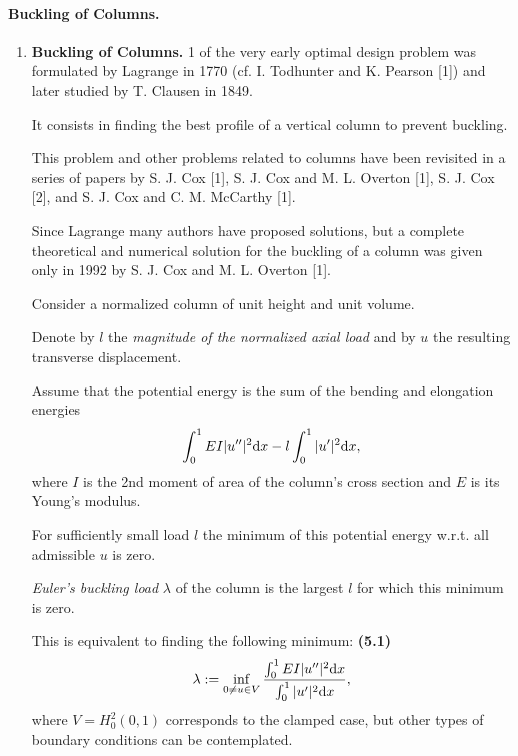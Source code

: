 \documentclass{book}
\numberwithin{equation}{section}
\begin{document}
\paragraph{Buckling of Columns.}
\begin{enumerate}
    \item \textbf{Buckling of Columns.} 1 of the very early optimal design problem was formulated by Lagrange in 1770 (cf. I. Todhunter and K. Pearson [1]) and later studied by T. Clausen in 1849.
    
    It consists in finding the best profile of a vertical column to prevent buckling.
    
    This problem and other problems related to columns have been revisited in a series of papers by S. J. Cox [1], S. J. Cox and M. L. Overton [1], S. J. Cox [2], and S. J. Cox and C. M. McCarthy [1].
    
    Since Lagrange many authors have proposed solutions, but a complete theoretical and numerical solution for the buckling of a column was given only in 1992 by S. J. Cox and M. L. Overton [1].
    
    Consider a normalized column of unit height and unit volume.
    
    Denote by $l$ the \textit{magnitude of the normalized axial load} and by $u$ the resulting transverse displacement.
    
    Assume that the potential energy is the sum of the bending and elongation energies
    \begin{align*}
        \int_0^1 EI|u''|^2{\rm d}x - l\int_0^1 |u'|^2{\rm d}x,
    \end{align*}
    where $I$ is the 2nd moment of area of the column's cross section and $E$ is its Young's modulus.
    
    For sufficiently small load $l$ the minimum of this potential energy w.r.t. all admissible $u$ is zero.
    
    \textit{Euler's buckling load} $\lambda$ of the column is the largest $l$ for which this minimum is zero.
    
    This is equivalent to finding the following minimum: \textbf{(5.1)}
    \begin{align*}
        \lambda := \inf_{0\ne u\in V} \frac{\int_0^1 EI|u''|^2{\rm d}x}{\int_0^1 |u'|^2{\rm d}x},
    \end{align*}
    where $V = H_0^2(0,1)$ corresponds to the clamped case, but other types of boundary conditions can be contemplated.
    

\end{enumerate}
\end{document}
